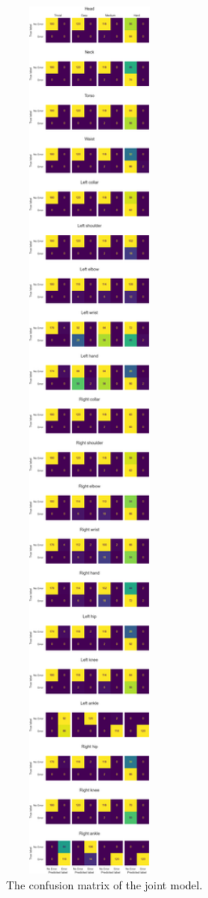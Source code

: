 \begin{figure}
  \centering
  \includegraphics[width=0.5\textwidth]{figures/results/confusion/joints.png}
  \caption[Joint model confusion matrix]{The confusion matrix of the joint model.}
  \label{fig:joint_confusion_matrix}
\end{figure}

